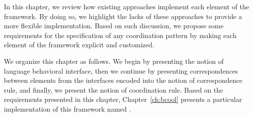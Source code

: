 In this chapter, we review how existing approaches implement each element of the framework. By doing so, we highlight the lacks of these approaches to provide a more flexible implementation. Based on such discussion, we propose some requirements for the specification of any coordination pattern by making each element of the framework explicit and customized. 

We organize this chapter as follows. We begin by presenting the notion of language behavioral interface, then we continue by presenting correspondences between elements from the interfaces encoded into the notion of correspondence rule, and finally, we present the notion of coordination rule. Based on the requirements presented in this chapter, Chapter~\ref{ch:bcool} presents a particular implementation of this framework named \bcool.

